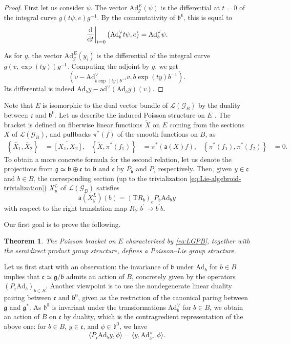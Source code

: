 \documentclass[a4paper,11pt]{amsart}
\newcommand{\s}[1]{\mathcal{#1}}
\newcommand{\fr}[1]{\mathfrak{#1}}
\newcommand{\sm}[1]{\mathsf{#1}}
\newcommand{\rT}{\mathrm T}
\newcommand{\pr}{\prime}
\newcommand{\Ad}{\mathrm{Ad}}
\newcommand{\ad}{\mathrm{ad}}
\newtheorem{thm}{Theorem}[section]
\theoremstyle{definition}
\theoremstyle{remark}
\begin{document}
\begin{proof}
First let us consider $\psi$.
The vector $\Ad^{E}_g (\psi)$ is the differential at $t = 0$ of the integral curve $g(t\psi, e)g^{-1}$.
By the commutativity of $\fr{b}^0$, this is equal to
\[
\left.\dv{t}\right|_{t=0} \left( \Ad^\vee_b t\psi , e \right) = \Ad^\vee_b \psi .
\]

As for $y$, the vector $\Ad^{E}_g (y_i)$ is the differential of the integral curve $g (v, \exp(t y)) g^{-1}$.
Computing the adjoint by $g$, we get
\[
\left( v - \Ad^\vee_{b\exp(t y)b^{-1}} v , b \exp(t y) b^{-1} \right).
\]
Its differential is indeed $\Ad_b y - \ad^\vee( \Ad_b y ) (v)$.
\end{proof}

Note that $E$ is isomorphic to the dual vector bundle of $\s{L}(\s{G}_B)$ by the duality between $\fr{c}$ and $\fr{b}^0$.
Let us describe the induced Poisson structure on $E$ \cite{MR998124}.
The bracket is defined on fiberwise linear functions $\tilde{X}$ on $E$ coming from the sections $X$ of $\s{L}(\s{G}_B)$, and pullbacks $\pi^*(f)$ of the smooth functions on $B$, as
\begin{align}
\label{eq:LGPB}
\left\{ \widetilde{X_1} , \widetilde{X_2} \right\} &= \widetilde{\left[ X_1 , X_2 \right]},&
\left\{ \widetilde{X} , \pi^*(f_1) \right\} &= \pi^*\left( \sm{a}(X) f \right),&
\left\{ \pi^*(f_1) , \pi^*(f_2) \right\} &= 0.
\end{align}
To obtain a more concrete formula for the second relation, let us denote the projections from $\fr{g} \simeq \fr b \oplus \fr c$ to $\fr{b}$ and $\fr{c}$ by $P_{\fr{b}}$ and $P_{\fr{c}}$ respectively.
Then, given $y \in \fr{c}$ and $b \in B$, the corresponding section (up to the trivialization \eqref{eq:Lie-algebroid-trivialization}) $X^L_y$ of $\s L(\s G_B)$ satisfies
\begin{equation}
\label{eq:anchor-map}
\sm{a}(X^L_y)(b) = (\rT R_b)_e P_{\fr{b}} \Ad_b y
\end{equation}
with respect to the right translation map $R_b\colon b^\pr \to b^\pr b$.

Our first goal is to prove the following.

\begin{thm}\label{thm:PLGS}
The Poisson bracket on $E$ characterized by \eqref{eq:LGPB}, together with the semidirect product group structure, defines a Poisson--Lie group structure.
\end{thm}

Let us first start with an observation: the invariance of $\fr{b}$ under $\Ad_b$ for $b \in B$ implies that $\fr{c} \simeq \fr{g} / \fr{b}$ admits an action of $B$, concretely given by the operators $(P_{\fr{c}} \Ad_b)_{b \in B}$.
Another viewpoint is to use the nondegenerate linear duality pairing between $\fr{c}$ and $\fr{b}^0$, given as the restriction of the canonical paring between $\fr{g}$ and $\fr{g}^*$. As $\fr b^0$ is invariant under the transformations $\Ad^\vee_b$ for $b \in B$, we obtain an action of $B$ on $\fr{c}$ by duality, which is the contragredient representation of the above one: for $b \in B$, $y \in \fr{c}$, and $\phi \in \fr{b}^0$, we have
\[
\langle P_{\fr{c}} \Ad_b y, \phi \rangle = \langle y, \Ad_{b^{-1}}^\vee \phi \rangle.
\]
\end{document}

